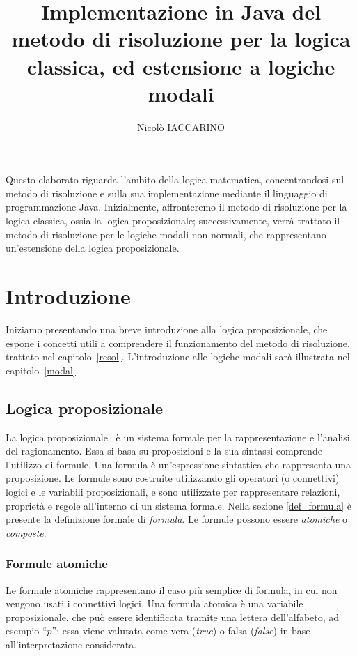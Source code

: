 \documentclass[a4paper,12pt]{report}
\begin{document}
\title{Implementazione in Java del metodo di risoluzione per la logica classica, ed estensione a logiche modali}
\author{Nicolò IACCARINO}
% 
%
\beforepreface

% 
%
Questo elaborato riguarda l'ambito della logica matematica, concentrandosi sul metodo di risoluzione e sulla sua implementazione mediante il linguaggio di programmazione Java. Inizialmente, affronteremo il metodo di risoluzione per la logica classica, ossia la logica proposizionale; successivamente, verrà trattato il metodo di risoluzione per le logiche modali non-normali, che rappresentano un'estensione della logica proposizionale.

\afterpreface
\pagestyle{mystyle} %
% 
% 
\chapter{Introduzione}
\label{intro}
Iniziamo presentando una breve introduzione alla logica proposizionale, che espone i concetti utili a comprendere il funzionamento del metodo di risoluzione, trattato nel capitolo~\ref{resol}. L'introduzione alle logiche modali sarà illustrata nel capitolo~\ref{modal}.

\section{Logica proposizionale}
La logica proposizionale~\cite{logica_prop} è un sistema formale per la rappresentazione e l'analisi del ragionamento. Essa si basa su proposizioni e la sua sintassi comprende l'utilizzo di formule. Una formula è un'espressione sintattica che rappresenta una proposizione. Le formule sono costruite utilizzando gli operatori (o connettivi) logici e le variabili proposizionali, e sono utilizzate per rappresentare relazioni, proprietà e regole all'interno di un sistema formale. Nella sezione \ref{def_formula} è presente la definizione formale di \emph{formula}. Le formule possono essere \emph{atomiche} o \emph{composte}.

\subsection*{Formule atomiche}
Le formule atomiche rappresentano il caso più semplice di formula, in cui non vengono usati i connettivi logici. Una formula atomica è una variabile proposizionale, che può essere identificata tramite una lettera dell'alfabeto, ad esempio ``$p$''; essa viene valutata come vera (\emph{true}) o falsa (\emph{false}) in base all'interpretazione considerata.
\end{document}
